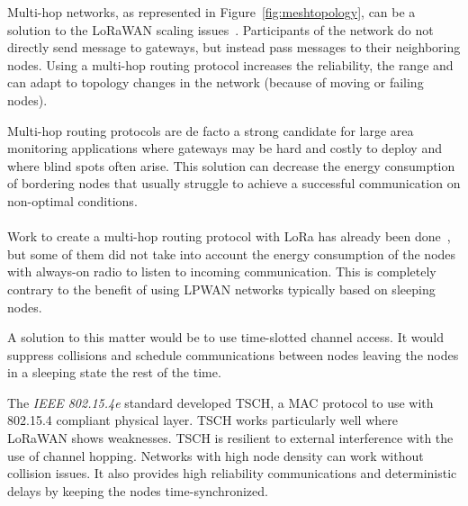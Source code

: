 


Multi-hop networks, as represented in Figure~\ref{fig:meshtopology}, can be a solution to
the LoRaWAN scaling issues~\cite{8115756}.
Participants of the network do not directly send message to gateways, but
instead pass messages to their neighboring nodes.
Using a multi-hop routing protocol increases the reliability, the range
and can adapt to topology changes in the network (because of moving or failing nodes).

Multi-hop routing protocols are de facto a strong candidate for large area monitoring 
applications where gateways may be hard and costly to deploy and where blind
spots often arise.
This solution can decrease the energy consumption of bordering nodes that
usually struggle to achieve a successful communication on non-optimal
conditions.

\paragraph{}

Work to create a multi-hop routing protocol with LoRa has already been
done~\cite{8115756, DIAS2018424, 8856256, Abrardo_2019, duong2018}, 
but some of them did not take into account the energy consumption of the nodes
with always-on radio to listen to incoming communication.
This is completely contrary to the benefit of using LPWAN networks typically
based on sleeping nodes.

A solution to this matter would be to use time-slotted channel access.
It would suppress collisions and schedule communications between nodes leaving
the nodes in a sleeping state the rest of the time.

The \emph{IEEE 802.15.4e} standard developed TSCH, a MAC
protocol to use with 802.15.4 compliant physical layer.
TSCH works particularly well where LoRaWAN shows weaknesses. 
TSCH is resilient to external interference with the use of channel hopping.
Networks with high node density can work without collision issues.
It also provides high reliability communications and deterministic delays by 
keeping the nodes time-synchronized.

